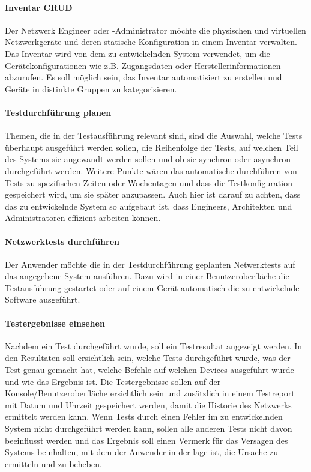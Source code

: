 \documentclass[]{subfiles}
\begin{document}
        \paragraph{Inventar CRUD}
        Der Netzwerk Engineer oder -Administrator möchte die physischen und virtuellen 
        Netzwerkgeräte und deren statische Konfiguration in einem Inventar verwalten.
        Das Inventar wird von dem zu entwickelnden System verwendet, um die 
        Gerätekonfigurationen wie z.B. Zugangsdaten oder Herstellerinformationen abzurufen.
        Es soll möglich sein, das Inventar automatisiert zu erstellen und Geräte in distinkte
        Gruppen zu kategorisieren. 

        \paragraph{Testdurchführung planen}
        Themen, die in der Testausführung relevant sind, sind die Auswahl, 
        welche Tests überhaupt ausgeführt werden sollen, die Reihenfolge der Tests, 
        auf welchen Teil des Systems sie angewandt werden sollen 
        und ob sie synchron oder asynchron durchgeführt werden. 
        Weitere Punkte wären das automatische durchführen von Tests zu spezifischen 
        Zeiten oder Wochentagen und dass die Testkonfiguration gespeichert wird, 
        um sie später anzupassen. 
        Auch hier ist darauf zu achten, dass das zu entwickelnde System so aufgebaut ist, 
        dass Engineers, Architekten und Administratoren effizient arbeiten können.

        \paragraph{Netzwerktests durchführen}
        Der Anwender möchte die in der Testdurchführung geplanten Netwerktests auf das
        angegebene System ausführen. 
        Dazu wird in einer Benutzeroberfläche die Testausführung gestartet oder auf
        einem Gerät automatisch die zu entwickelnde Software ausgeführt.

        \paragraph{Testergebnisse einsehen}
        Nachdem ein Test durchgeführt wurde, soll ein Testresultat angezeigt werden. 
        In den Resultaten soll ersichtlich sein, welche Tests durchgeführt wurde, 
        was der Test genau gemacht hat, welche Befehle auf welchen Devices ausgeführt 
        wurde und wie das Ergebnis ist. 
        Die Testergebnisse sollen auf der Konsole/Benutzeroberfläche ersichtlich sein 
        und zusätzlich in einem Testreport mit Datum und Uhrzeit gespeichert werden, 
        damit die Historie des Netzwerks ermittelt werden kann. 
        Wenn Tests durch einen Fehler im zu entwickelnden System nicht durchgeführt 
        werden kann, sollen alle anderen Tests nicht davon beeinflusst werden und 
        das Ergebnis soll einen Vermerk für das Versagen des Systems beinhalten,
        mit dem der Anwender in der lage ist, die Ursache zu ermitteln und zu beheben.
\end{document}
